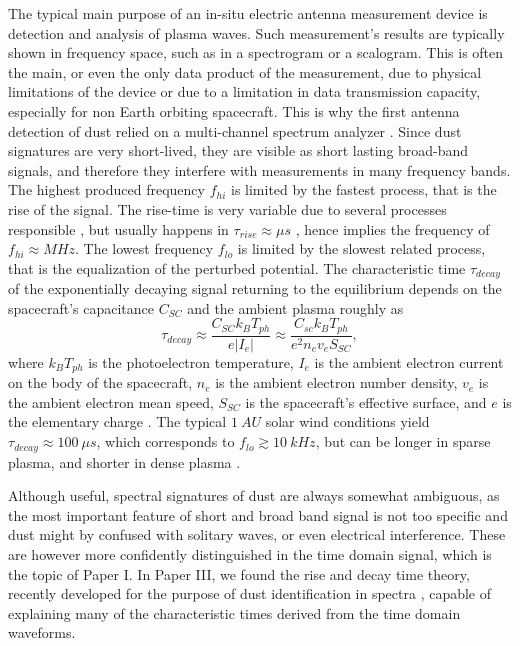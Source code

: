 The typical main purpose of an in-situ electric antenna measurement device is detection and analysis of plasma waves. Such measurement's results are typically shown in frequency space, such as in a spectrogram or a scalogram. This is often the main, or even the only data product of the measurement, due to physical limitations of the device or due to a limitation in data transmission capacity, especially for non Earth orbiting spacecraft. This is why the first antenna detection of dust relied on a multi-channel spectrum analyzer \citep{scarf1982voyager}. Since dust signatures are very short-lived, they are visible as short lasting broad-band signals, and therefore they interfere with measurements in many frequency bands. The highest produced frequency $f_{hi}$ is limited by the fastest process, that is the rise of the signal. The rise-time is very variable due to several processes responsible \citep{meyer2017frequency,shen2023variability}, but usually happens in $\tau_{rise} \approx \si{\mu s}$ \citep{meyer2017frequency}, hence implies the frequency of $f_{hi} \approx \si{M Hz}$. The lowest frequency $f_{lo}$ is limited by the slowest related process, that is the equalization of the perturbed potential. The characteristic time $\tau_{decay}$ of the exponentially decaying signal returning to the equilibrium depends on the spacecraft's capacitance $C_{SC}$ and the ambient plasma roughly as 
\begin{equation}    
\tau_{decay} \approx \frac{C_{SC} k_B T_{ph}}{e|I_{e}|} \approx \frac{C_{sc} k_B T_{ph}}{e^2 n_e v_e S_{SC}}, 
\end{equation}
where $k_B T_{ph}$ is the photoelectron temperature, $I_e$ is the ambient electron current on the body of the spacecraft, $n_e$ is the ambient electron number density, $v_e$ is the ambient electron mean speed, $S_{SC}$ is the spacecraft's effective surface, and $e$ is the elementary charge \citep{henri2011observations}. The typical $\SI{1}{AU}$ solar wind conditions yield $\tau_{decay} \approx \SI{100}{\mu s}$, which corresponds to $f_{lo} \gtrsim \SI{10}{kHz}$, but can be longer in sparse plasma, and shorter in dense plasma \citep{vaverka2017detection}. 

Although useful, spectral signatures of dust are always somewhat ambiguous, as the most important feature of short and broad band signal is not too specific and dust might by confused with solitary waves, or even electrical interference. These are however more confidently distinguished in the time domain signal, which is the topic of Paper I. In Paper III, we found the rise and decay time theory, recently developed for the purpose of dust identification in spectra \citep{meyer2017frequency}, capable of explaining many of the characteristic times derived from the time domain waveforms.

